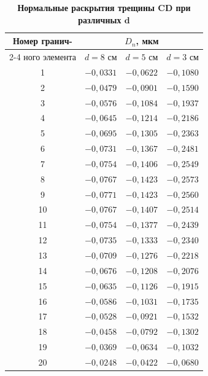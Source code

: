 \begin{table}[t!]
\centering
\begin{minipage}[t]{128mm}
\setlength{\tabcolsep}{24pt}
 \small \centering
\caption{\bf Нормальные раскрытия трещины $\boldsymbol{CD}$ при различных $\boldsymbol{d}$}\vspace{-3mm} %
\begin{tabular}{c|c|c|c}
\hline
\footnotesize Номер  гранич-   &    \multicolumn{3}{c}{\footnotesize $D_{n}$, мкм} \\
\cline{2-4}
\footnotesize ного элемента  &  \footnotesize $d=8$ см  &  \footnotesize $d=5$  см & \footnotesize $d=3$ см  \\ 
\hline 
\rule{0mm}{14pt}%
1 & $-0,0331$ & $-0,0622$ & $-0,1080$ \\
2 & $-0,0479$ & $-0,0901$ & $-0,1590$ \\
3 & $-0,0576$ & $-0,1084$ & $-0,1937$ \\
4 & $-0,0645$ & $-0,1214$ & $-0,2186$ \\
5 & $-0,0695$ & $-0,1305$ & $-0,2363$ \\
6 & $-0,0731$ & $-0,1367$ & $-0,2481$ \\
7 & $-0,0754$ & $-0,1406$ & $-0,2549$ \\
8 & $-0,0767$ & $-0,1423$ & $-0,2573$ \\
9 & $-0,0771$ & $-0,1423$ & $-0,2560$ \\
10 & $-0,0767$ & $-0,1407$ & $-0,2514$ \\
11 & $-0,0754$ & $-0,1377$ & $-0,2439$ \\
12 & $-0,0735$ & $-0,1333$ & $-0,2340$ \\
13 & $-0,0709$ & $-0,1276$ & $-0,2218$ \\
14 & $-0,0676$ & $-0,1208$ & $-0,2076$ \\
15 & $-0,0635$ & $-0,1126$ & $-0,1915$ \\
16 & $-0,0586$ & $-0,1031$ & $-0,1735$ \\
17 & $-0,0528$ & $-0,0921$ & $-0,1532$ \\
18 & $-0,0458$ & $-0,0792$ & $-0,1302$ \\
19 & $-0,0369$ & $-0,0634$ & $-0,1032$ \\
20 & $-0,0248$ & $-0,0422$ & $-0,0680$ \\
\hline
\end{tabular} \label{tab4}
\end{minipage}
\end{table}

